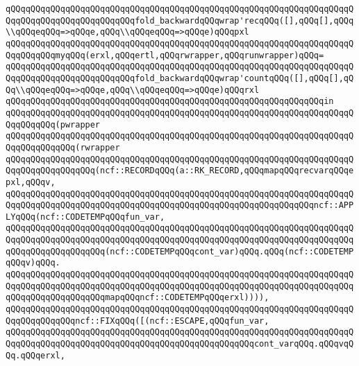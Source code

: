 \verb|qQQqqQQqqQQqqQQqqQQqqQQqqQQqqQQqqQQqqQQqqQQqqQQqqQQqqQQqqQQqqQQqqQQqqQQqqQQqqQQqqQQqqQQqqQQqqQQqfold_backwardqQQqwrap'recqQQq([],qQQq[],qQQq\\qQQqeqQQq=>qQQqe,qQQq\\qQQqeqQQq=>qQQqe)qQQqpxl|\newline
\verb|qQQqqQQqqQQqqQQqqQQqqQQqqQQqqQQqqQQqqQQqqQQqqQQqqQQqqQQqqQQqqQQqqQQqqQQqqQQqqQQqmyqQQq(erxl,qQQqertl,qQQqrwrapper,qQQqrunwrapper)qQQq=|\newline
\verb|qQQqqQQqqQQqqQQqqQQqqQQqqQQqqQQqqQQqqQQqqQQqqQQqqQQqqQQqqQQqqQQqqQQqqQQqqQQqqQQqqQQqqQQqqQQqqQQqfold_backwardqQQqwrap'countqQQq([],qQQq[],qQQq\\qQQqeqQQq=>qQQqe,qQQq\\qQQqeqQQq=>qQQqe)qQQqrxl|\newline
\verb|qQQqqQQqqQQqqQQqqQQqqQQqqQQqqQQqqQQqqQQqqQQqqQQqqQQqqQQqqQQqqQQqin|\newline
\verb|qQQqqQQqqQQqqQQqqQQqqQQqqQQqqQQqqQQqqQQqqQQqqQQqqQQqqQQqqQQqqQQqqQQqqQQqqQQqqQQq(pwrapper|\newline
\verb|qQQqqQQqqQQqqQQqqQQqqQQqqQQqqQQqqQQqqQQqqQQqqQQqqQQqqQQqqQQqqQQqqQQqqQQqqQQqqQQqqQQq(rwrapper|\newline
\verb|qQQqqQQqqQQqqQQqqQQqqQQqqQQqqQQqqQQqqQQqqQQqqQQqqQQqqQQqqQQqqQQqqQQqqQQqqQQqqQQqqQQqqQQq(ncf::RECORDqQQq(a::RK_RECORD,qQQqmapqQQqrecvarqQQqepxl,qQQqv,|\newline
\verb|qQQqqQQqqQQqqQQqqQQqqQQqqQQqqQQqqQQqqQQqqQQqqQQqqQQqqQQqqQQqqQQqqQQqqQQqqQQqqQQqqQQqqQQqqQQqqQQqqQQqqQQqqQQqqQQqqQQqqQQqqQQqqQQqqQQqncf::APPLYqQQq(ncf::CODETEMPqQQqfun_var,|\newline
\verb|qQQqqQQqqQQqqQQqqQQqqQQqqQQqqQQqqQQqqQQqqQQqqQQqqQQqqQQqqQQqqQQqqQQqqQQqqQQqqQQqqQQqqQQqqQQqqQQqqQQqqQQqqQQqqQQqqQQqqQQqqQQqqQQqqQQqqQQqqQQqqQQqqQQqqQQqqQQqqQQq(ncf::CODETEMPqQQqcont_var)qQQq.qQQq(ncf::CODETEMPqQQqv)qQQq.|\newline
\verb|qQQqqQQqqQQqqQQqqQQqqQQqqQQqqQQqqQQqqQQqqQQqqQQqqQQqqQQqqQQqqQQqqQQqqQQqqQQqqQQqqQQqqQQqqQQqqQQqqQQqqQQqqQQqqQQqqQQqqQQqqQQqqQQqqQQqqQQqqQQqqQQqqQQqqQQqqQQqqQQqmapqQQqncf::CODETEMPqQQqerxl)))),|\newline
\verb|qQQqqQQqqQQqqQQqqQQqqQQqqQQqqQQqqQQqqQQqqQQqqQQqqQQqqQQqqQQqqQQqqQQqqQQqqQQqqQQqqQQqncf::FIXqQQq([(ncf::ESCAPE,qQQqfun_var,|\newline
\verb|qQQqqQQqqQQqqQQqqQQqqQQqqQQqqQQqqQQqqQQqqQQqqQQqqQQqqQQqqQQqqQQqqQQqqQQqqQQqqQQqqQQqqQQqqQQqqQQqqQQqqQQqqQQqqQQqqQQqqQQqcont_varqQQq.qQQqvqQQq.qQQqerxl,|\newline
